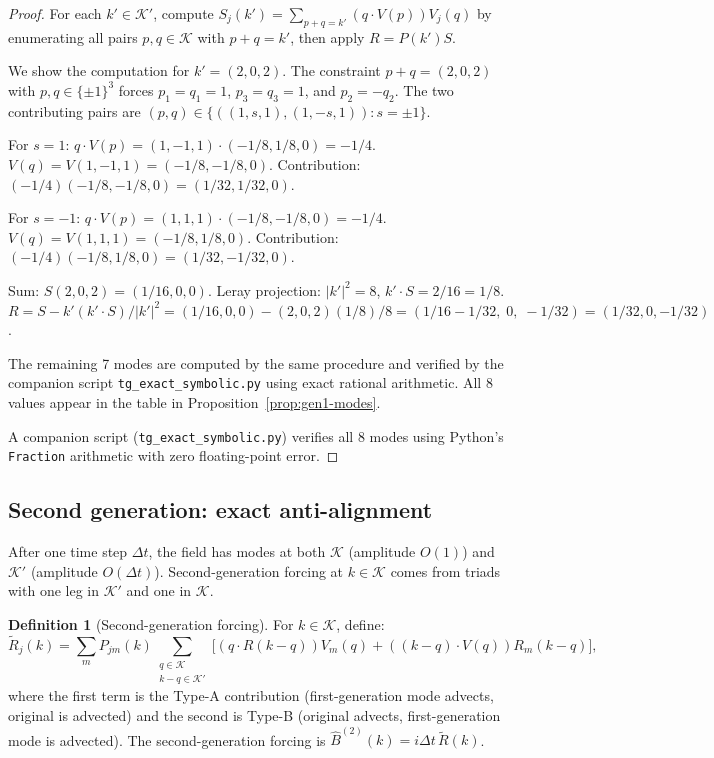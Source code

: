 \documentclass[11pt]{article}
\theoremstyle{definition}
\newtheorem{definition}[theorem]{Definition}
\newcommand{\cK}{\mathcal{K}}
\begin{document}
\begin{proof}
For each $k'\in\cK'$, compute
$S_j(k')=\sum_{p+q=k'}(q\cdot V(p))V_j(q)$ by
enumerating all pairs $p,q\in\cK$ with $p+q=k'$,
then apply $R = P(k')S$.

We show the computation for $k'=(2,0,2)$.  The
constraint $p+q=(2,0,2)$ with $p,q\in\{\pm 1\}^3$
forces $p_1=q_1=1$, $p_3=q_3=1$, and $p_2=-q_2$.
The two contributing pairs are
$(p,q)\in\{((1,s,1),(1,-s,1)):s=\pm 1\}$.

For $s=1$: $q\cdot V(p) = (1,-1,1)\cdot(-1/8,1/8,0)
= -1/4$.  $V(q) = V(1,-1,1) = (-1/8,-1/8,0)$.
Contribution: $(-1/4)(-1/8,-1/8,0) = (1/32,1/32,0)$.

For $s=-1$: $q\cdot V(p) = (1,1,1)\cdot(-1/8,-1/8,0)
= -1/4$.  $V(q) = V(1,1,1) = (-1/8,1/8,0)$.
Contribution: $(-1/4)(-1/8,1/8,0) = (1/32,-1/32,0)$.

Sum: $S(2,0,2) = (1/16, 0, 0)$.
Leray projection: $|k'|^2=8$, $k'\cdot S = 2/16 = 1/8$.
$R = S - k'(k'\cdot S)/|k'|^2
= (1/16,0,0) - (2,0,2)(1/8)/8
= (1/16-1/32,\; 0,\; -1/32)
= (1/32, 0, -1/32)$.

The remaining 7 modes are computed by the same procedure
and verified by the companion script
\texttt{tg\_exact\_symbolic.py} using exact rational
arithmetic.  All 8 values appear in the table in
Proposition~\ref{prop:gen1-modes}.

A companion script (\texttt{tg\_exact\_symbolic.py})
verifies all 8 modes using Python's \texttt{Fraction}
arithmetic with zero floating-point error.
\end{proof}

\subsection{Second generation: exact anti-alignment}

After one time step $\Delta t$, the field has modes
at both $\cK$ (amplitude $O(1)$) and $\cK'$ (amplitude
$O(\Delta t)$).  Second-generation forcing at $k\in\cK$
comes from triads with one leg in $\cK'$ and one in $\cK$.

\begin{definition}[Second-generation forcing]
\label{def:gen2}
For $k\in\cK$, define:
\begin{equation}\label{eq:Rtilde}
\widetilde R_j(k) = \sum_mP_{jm}(k)\sum_{\substack{
q\in\cK\\k-q\in\cK'}}
\bigl[(q\cdot R(k\!-\!q))V_m(q)
+((k\!-\!q)\cdot V(q))R_m(k\!-\!q)\bigr],
\end{equation}
where the first term is the Type-A contribution
(first-generation mode advects, original is advected)
and the second is Type-B (original advects,
first-generation mode is advected).
The second-generation forcing is
$\hat B^{(2)}(k) = i\Delta t\,\widetilde R(k)$.
\end{definition}
\end{document}
